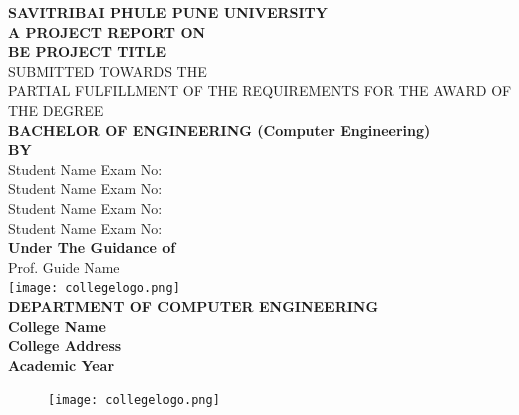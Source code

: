 \documentclass[oneside,a4paper,12pt]{report}
\begin{document}
\setlength{\parindent}{0mm}
\begin{center}
{\bfseries SAVITRIBAI PHULE PUNE UNIVERSITY \\}
 \vspace*{1\baselineskip}
{\bfseries A PROJECT REPORT ON \\}
 \vspace*{2\baselineskip}
{\bfseries \fontsize{16}{12} \selectfont BE PROJECT TITLE \\ \vspace*{2\baselineskip}}
{\fontsize{12}{12} \selectfont SUBMITTED TOWARDS THE
 \\PARTIAL FULFILLMENT OF THE REQUIREMENTS FOR THE AWARD OF THE DEGREE \\

\vspace*{2\baselineskip}}
{\bfseries \fontsize{14}{12} \selectfont BACHELOR OF ENGINEERING (Computer
Engineering) \\
\vspace*{1\baselineskip}} 
{\bfseries \fontsize{14}{12} \selectfont BY \\ 
\vspace*{1\baselineskip}} 
Student Name  \hspace{25 mm} Exam No:  \\
Student Name \hspace{25 mm} Exam No:   \\
Student Name \hspace{25 mm} Exam No:  \\
Student Name \hspace{25 mm} Exam No:\\
\vspace*{2\baselineskip}
{\bfseries \fontsize{14}{12} \selectfont Under The Guidance of \\  
\vspace*{2\baselineskip}} 
Prof. Guide Name\\
\texttt{[image: collegelogo.png]} \\
{\bfseries \fontsize{14}{12} \selectfont DEPARTMENT OF COMPUTER ENGINEERING \\
College Name \\
College Address \\
\vspace*{1\baselineskip}
Academic Year
}
\end{center}


\newpage



\begin{figure}[ht]
\centering
\texttt{[image: collegelogo.png]}
\end{figure}
\end{document}
